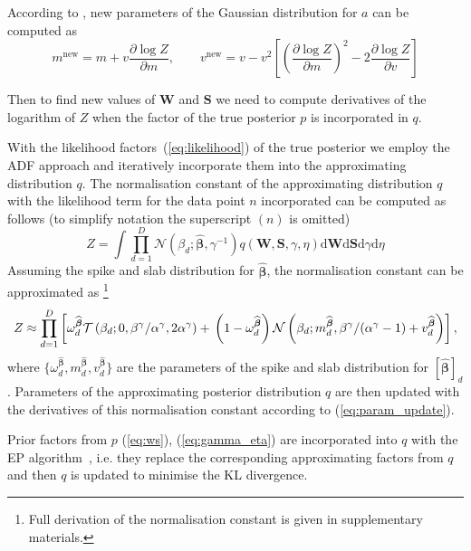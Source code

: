 \documentclass{article}
\begin{document}
According to \cite{minka2001thesis}, new parameters of the Gaussian distribution for $a$ can be computed as
\begin{equation}
\label{eq:param_update}
m^{\text{new}} = m + v \frac{\partial \log Z}{\partial m}, \qquad
v^{\text{new}} = v - v^2\left[ \left(\frac{\partial \log Z}{\partial m}\right)^2 - 2 \frac{\partial \log Z}{\partial v}\right]
\end{equation}

Then to find new values of $\mathbf{W}$ and $\mathbf{S}$ we need to compute derivatives of the logarithm of $Z$ when the factor of the true posterior $p$ is incorporated in $q$.

With the likelihood factors~(\ref{eq:likelihood}) of the true posterior we employ the ADF approach and iteratively incorporate them into the approximating distribution $q$. The normalisation constant of the approximating distribution $q$ with the likelihood term for the data point $n$ incorporated can be computed as follows (to simplify notation the superscript $(n)$ is omitted)
\begin{equation}
Z  = \int \prod_{d=1}^{D} \mathcal{N}(\beta_d ; \widehat{\boldsymbol\beta}, \gamma^{-1}) q(\mathbf{W}, \mathbf{S}, \gamma, \eta) \mathrm{d}\mathbf{W} \mathrm{d}\mathbf{S} \mathrm{d}\gamma \mathrm{d}\eta
\end{equation}
Assuming the spike and slab distribution for $\widehat{\boldsymbol\beta}$, the normalisation constant can be approximated as \footnote{Full derivation of the normalisation constant is given in supplementary materials.}
\begin{equation}
\label{eq:Z}
Z \approx \prod_{d=1}^D \left[\omega^{\widehat{\boldsymbol\beta}}_d  \mathcal{T}\left(\beta_d ; 0, \beta^\gamma / \alpha^\gamma, 2\alpha^\gamma\right) + \vphantom{m^{\widehat{\boldsymbol\beta}}_d} \left(1 - \omega^{\widehat{\boldsymbol\beta}}_d\right)\mathcal{N}\left(\beta_d ; m^{\widehat{\boldsymbol\beta}}_d,  \beta^\gamma / (\alpha^\gamma - 1) + v^{\widehat{\boldsymbol\beta}}_d\right)\right],
\end{equation}
where $\{\omega^{\widehat{\boldsymbol\beta}}_d, m^{\widehat{\boldsymbol\beta}}_d, v^{\widehat{\boldsymbol\beta}}_d\}$ are the parameters of the spike and slab distribution for $[\widehat{\boldsymbol\beta}]_d$. Parameters of the approximating posterior distribution $q$ are then updated with the derivatives of this normalisation constant according to (\ref{eq:param_update}).

Prior factors from $p$ (\ref{eq:ws}), (\ref{eq:gamma_eta}) are incorporated into $q$ with the EP algorithm~\cite{hernandez2015probabilistic}, i.e. they replace the corresponding approximating factors from $q$ and then $q$ is updated to minimise the KL divergence.
\end{document}
